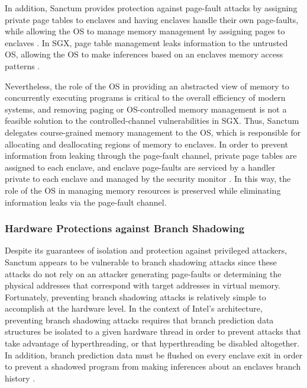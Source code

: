 In addition, Sanctum provides protection against page-fault attacks by assigning private page tables to enclaves and having enclaves handle their own page-faults, while allowing the OS to manage memory management by assigning pages to enclaves \cite{costan_sanctum:_2016, costan_sanctum:_2015}. In SGX, page table management leaks information to the untrusted OS, allowing the OS to make inferences based on an enclaves memory access patterns \cite{costan_sanctum:_2016, costan_sanctum:_2015, costan_intel_2016}. 

Nevertheless, the role of the OS in providing an abstracted view of memory to concurrently executing programs is critical to the overall efficiency of modern systems, and removing paging or OS-controlled memory management is not a feasible solution to the controlled-channel vulnerabilities in SGX. Thus, Sanctum delegates course-grained memory management to the OS, which is responsible for allocating and deallocating regions of memory to enclaves. In order to prevent information from leaking through the page-fault channel, private page tables are assigned to each enclave, and enclave page-faults are serviced by a handler private to each enclave and managed by the security monitor \cite{costan_sanctum:_2016, costan_sanctum:_2015}. In this way, the role of the OS in managing memory resources is preserved while eliminating information leaks via the page-fault channel.

\subsubsection{Hardware Protections against Branch Shadowing}

Despite its guarantees of isolation and protection against privileged attackers, Sanctum appears to be vulnerable to branch shadowing attacks since these attacks do not rely on an attacker generating page-faults or determining the physical addresses that correspond with target addresses in virtual memory. Fortunately, preventing branch shadowing attacks is relatively simple to accomplish at the hardware level. In the context of Intel's architecture, preventing branch shadowing attacks requires that branch prediction data structures be isolated to a given hardware thread in order to prevent attacks that take advantage of hyperthreading, or that hyperthreading be disabled altogether. In addition, branch prediction data must be flushed on every enclave exit in order to prevent a shadowed program from making inferences about an enclaves branch history \cite{costan_sanctum:_2016, costan_sanctum:_2015, lee_inferring_2017}.

